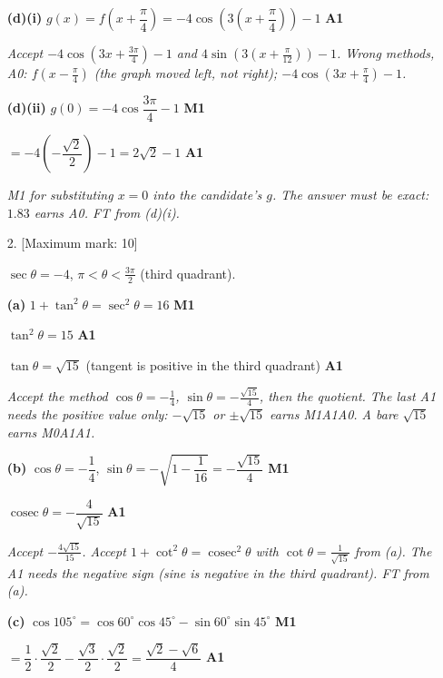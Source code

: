 \documentclass[12pt, twoside]{article}
\begin{document}
\begin{enumerate}[itemsep=0.3cm]
\newpage

\textbf{(d)(i)} $g(x) = f\!\left(x + \dfrac{\pi}{4}\right)
= -4\cos\left(3\left(x + \dfrac{\pi}{4}\right)\right) - 1$ \hfill \textbf{A1}

\emph{Accept $-4\cos\left(3x + \frac{3\pi}{4}\right) - 1$ and
$4\sin\left(3\left(x + \frac{\pi}{12}\right)\right) - 1$. Wrong methods,
A0: $f\!\left(x - \frac{\pi}{4}\right)$ (the graph moved left, not right);
$-4\cos\left(3x + \frac{\pi}{4}\right) - 1$.}

\textbf{(d)(ii)} $g(0) = -4\cos\dfrac{3\pi}{4} - 1$ \hfill \textbf{M1}

$= -4\left(-\dfrac{\sqrt{2}}{2}\right) - 1 = 2\sqrt{2} - 1$ \hfill \textbf{A1}

\emph{M1 for substituting $x = 0$ into the candidate's $g$. The answer must
be exact: $1.83$ earns A0. FT from (d)(i).}

\newpage

\item[2.] [Maximum mark: 10]

$\sec\theta = -4$, $\pi < \theta < \frac{3\pi}{2}$ (third quadrant).

\textbf{(a)} $1 + \tan^{2}\theta = \sec^{2}\theta = 16$ \hfill \textbf{M1}

$\tan^{2}\theta = 15$ \hfill \textbf{A1}

$\tan\theta = \sqrt{15}$ \quad (tangent is positive in the third quadrant)
\hfill \textbf{A1}

\emph{Accept the method $\cos\theta = -\frac{1}{4}$, $\sin\theta =
-\frac{\sqrt{15}}{4}$, then the quotient. The last A1 needs the positive
value only: $-\sqrt{15}$ or $\pm\sqrt{15}$ earns M1A1A0. A bare $\sqrt{15}$
earns M0A1A1.}

\textbf{(b)} $\cos\theta = -\dfrac{1}{4}$, \quad
$\sin\theta = -\sqrt{1 - \dfrac{1}{16}} = -\dfrac{\sqrt{15}}{4}$
\hfill \textbf{M1}

$\operatorname{cosec}\theta = -\dfrac{4}{\sqrt{15}}$ \hfill \textbf{A1}

\emph{Accept $-\frac{4\sqrt{15}}{15}$. Accept $1 + \cot^{2}\theta =
\operatorname{cosec}^{2}\theta$ with $\cot\theta = \frac{1}{\sqrt{15}}$ from
(a). The A1 needs the negative sign (sine is negative in the third
quadrant). FT from (a).}

\textbf{(c)} $\cos 105^\circ = \cos 60^\circ\cos 45^\circ - \sin 60^\circ\sin 45^\circ$
\hfill \textbf{M1}

$= \dfrac{1}{2}\cdot\dfrac{\sqrt{2}}{2} - \dfrac{\sqrt{3}}{2}\cdot\dfrac{\sqrt{2}}{2}
= \dfrac{\sqrt{2} - \sqrt{6}}{4}$ \hfill \textbf{A1}


\end{enumerate}
\end{document}
